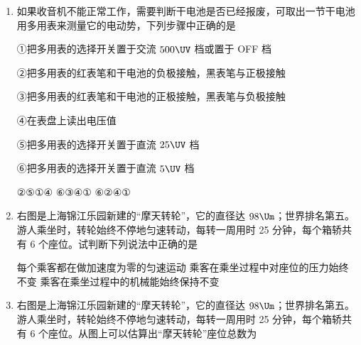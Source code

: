 \documentclass[\gkver]{gaokaozhenti}
\begin{document}
\begin{enumerate}
{电风扇比电冰箱多}
{电风扇与电冰箱一样多}
{电冰箱比电风扇可能多，也可能少}


\item
如果收音机不能正常工作，需要判断干电池是否已经报废，可取出一节干电池用多用表来测量它的电动势，下列步骤中正确的是

①把多用表的选择开关置于交流 $500\UV$ 档或置于 OFF 档

②把多用表的红表笔和干电池的负极接触，黑表笔与正极接触

③把多用表的红表笔和干电池的正极接触，黑表笔与负极接触

④在表盘上读出电压值

⑤把多用表的选择开关置于直流 $25\UV$ 档

⑥把多用表的选择开关置于直流 $5\UV$ 档

{②⑤①④}
{⑥③④①}
{⑥②④①}


\item
右图是上海锦江乐园新建的“摩天转轮”，它的直径达 $98\Um$；世界排名第五。游人乘坐时，转轮始终不停地匀速转动，每转一周用时 25 分钟，每个箱轿共有 6 个座位。试判断下列说法中正确的是


{每个乘客都在做加速度为零的匀速运动}
{乘客在乘坐过程中对座位的压力始终不变}
{乘客在乘坐过程中的机械能始终保持不变}


\item
右图是上海锦江乐园新建的“摩天转轮”，它的直径达 $98\Um$；世界排名第五。游人乘坐时，转轮始终不停地匀速转动，每转一周用时 25 分钟，每个箱轿共有 6 个座位。从图上可以估算出“摩天转轮”座位总数为


\end{enumerate}
\end{document}

